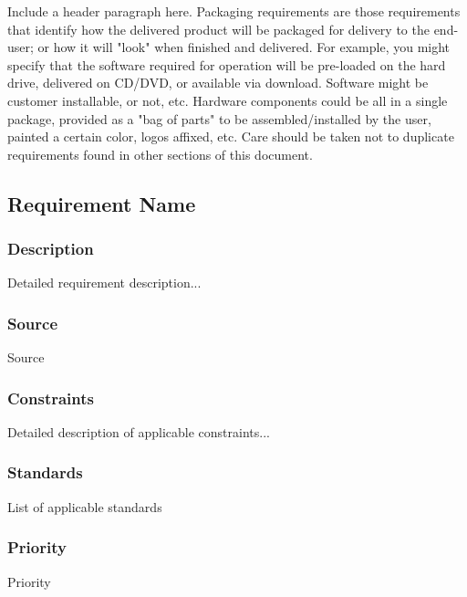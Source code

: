Include a header paragraph here. Packaging requirements are those requirements that identify how the delivered product will be packaged for delivery to the end-user; or how it will "look" when finished and delivered. For example, you might specify that the software required for operation will be pre-loaded on the hard drive, delivered on CD/DVD, or available via download. Software might be customer installable, or not, etc. Hardware components could be all in a single package, provided as a "bag of parts" to be assembled/installed by the user, painted a certain color, logos affixed, etc. Care should be taken not to duplicate requirements found in other sections of this document.

\subsection{Requirement Name}
\subsubsection{Description}
Detailed requirement description...
\subsubsection{Source}
Source
\subsubsection{Constraints}
Detailed description of applicable constraints...
\subsubsection{Standards}
List of applicable standards
\subsubsection{Priority}
Priority